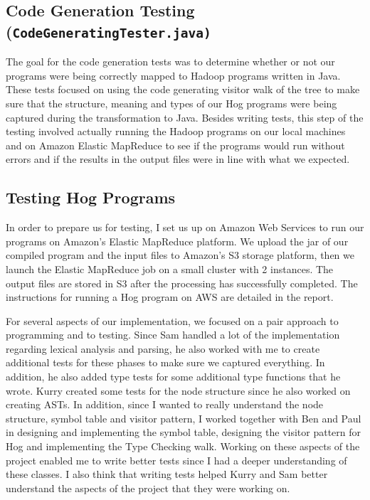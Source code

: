 \documentclass{book}
\begin{document}
\subsection*{Code Generation Testing (\tt CodeGeneratingTester.java\rm)}

The goal for the code generation tests was to determine whether or not our programs were being correctly mapped to Hadoop programs written in Java. These tests focused on using the code generating visitor walk of the tree to make sure that the structure, meaning and types of our Hog programs were being captured during the transformation to Java. Besides writing tests, this step of the testing involved actually running the Hadoop programs on our local machines and on Amazon Elastic MapReduce to see if the programs would run without errors and if the results in the output files were in line with what we expected.

\subsection*{Testing Hog Programs}

In order to prepare us for testing, I set us up on Amazon Web Services to run our programs on Amazon’s Elastic MapReduce platform. We upload the jar of our compiled program and the input files to Amazon’s S3 storage platform, then we launch the Elastic MapReduce job on a small cluster with 2 instances. The output files are stored in S3 after the processing has successfully completed. The instructions for running a Hog program on AWS are detailed in the report.

For several aspects of our implementation, we focused on a pair approach to programming and to testing. Since Sam handled a lot of the implementation regarding lexical analysis and parsing, he also worked with me to create additional tests for these phases to make sure we captured everything. In addition, he also added type tests for some additional type functions that he wrote. Kurry created some tests for the node structure since he also worked on creating ASTs. In addition, since I wanted to really understand the node structure, symbol table and visitor pattern, I worked together with Ben and Paul in designing and implementing the symbol table, designing the visitor pattern for Hog and implementing the Type Checking walk. Working on these aspects of the project enabled me to write better tests since I had a deeper understanding of these classes. I also think that writing tests helped Kurry and Sam better understand the aspects of the project that they were working on. 
\end{document}
